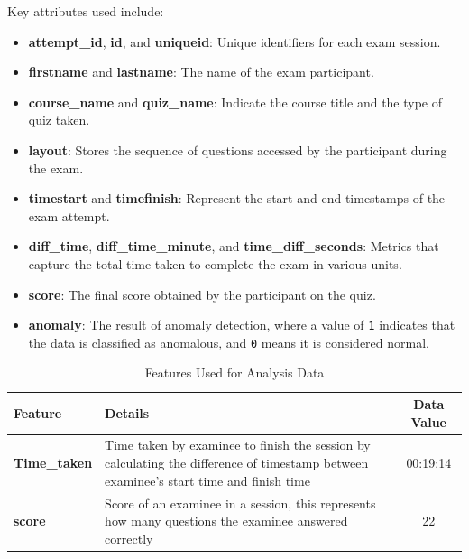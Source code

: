 Key attributes used include:

\begin{itemize}
  \item \textbf{attempt\_id}, \textbf{id}, and \textbf{uniqueid}: Unique identifiers for each exam session.
  \item \textbf{firstname} and \textbf{lastname}: The name of the exam participant.
  \item \textbf{course\_name} and \textbf{quiz\_name}: Indicate the course title and the type of quiz taken.
  \item \textbf{layout}: Stores the sequence of questions accessed by the participant during the exam.
  \item \textbf{timestart} and \textbf{timefinish}: Represent the start and end timestamps of the exam attempt.
  \item \textbf{diff\_time}, \textbf{diff\_time\_minute}, and \textbf{time\_diff\_seconds}: Metrics that capture the total time taken to complete the exam in various units.
  \item \textbf{score}: The final score obtained by the participant on the quiz.
  \item \textbf{anomaly}: The result of anomaly detection, where a value of \texttt{1} indicates that the data is classified as anomalous, and \texttt{0} means it is considered normal.
\end{itemize}


\begin{table}[H]
    \centering
    \caption{Features Used for Analysis Data}
    \begin{tabular}{|l|p{10cm}|c|}
        \hline
        \textbf{Feature} & \textbf{Details} & \textbf{Data Value} \\
        \hline
        \textbf{Time\_taken} & Time taken by examinee to finish the session by calculating the difference of timestamp between examinee’s start time and finish time & 00:19:14 \\
        \hline
        \textbf{score} & Score of an examinee in a session, this represents how many questions the examinee answered correctly & 22 \\
        \hline
    \end{tabular}
\end{table}


